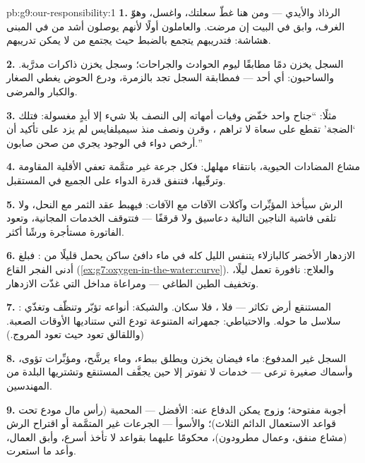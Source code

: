 \begin{solution}{pb:g9:our-responsibility:1}
\textbf{1.} الرذاذ والأيدي --- ومن هنا غطّ سعلتك، واغسل،
وهوّ الغرف، وابق في البيت إن مرضت. والعاملون أولًا لأنهم
يوصلون أشد من في المبنى هشاشة: فتدريبهم يتجمع بالضبط حيث
يجتمع من لا يمكن تدريبهم.

\textbf{2.} السجل يخزن دمًا مطابقًا ليوم الحوادث
والجراحات؛ وسجل  يخزن ذاكرات مدرَّبة. والساحبون:
أي أحد --- فمطابقة السجل تجد بالزمرة، ودرع الحوض يغطي
الصغار والكبار والمرضى.

\textbf{3.} مثلًا: ``جناح واحد خفّض وفيات أمهاته إلى
النصف بلا شيء إلا أيدٍ مغسولة: فتلك `الضجة' تقطع على
سعاة لا تراهم ، وقرن ونصف منذ سيميلفايس لم يزد على
تأكيد أن أرخص دواء في الوجود يجري من صحن صابون.''

\textbf{4.} مشاع المضادات الحيوية، بانتقاء مهلهل: فكل
جرعة غير متمَّمة تعفي الأقلية المقاومة وترقّيها، فتنفق
قدرة الدواء على  الجميع في المستقبل.

\textbf{5.} الرش سيأخذ المؤبِّرات وآكلات الآفات مع
الآفات: فيهبط عقد الثمر مع النحل، ولا تلقى فاشية
الناجين التالية دعاسيق ولا قرقفًا --- فتتوقف الخدمات
المجانية، وتعود الفاتورة  مستأجرة ورشًا أكثر.

\textbf{6.} الازدهار الأخضر كالبازلاء يتنفس الليل كله في
ماء دافئ ساكن يحمل قليلًا من : فبلغ أدنى الفجر
القاع (\cref{ex:g7:oxygen-in-the-water:curve}).
والعلاج: نافورة تعمل ليلًا، وتخفيف الطين  الطاغي
--- ومراعاة مداخل  التي غذّت الازدهار.

\textbf{7.} : المستنقع أرض تكاثر --- فلا ، فلا
سكان. والشبكة: أنواعه تؤبّر وتنظّف وتغذّي سلاسل ما حوله.
والاحتياطي: جمهراته المتنوعة تودع  التي ستناديها
الأوقات الصعبة. (واللقالق تعود حيث تعود المروج.)

\textbf{8.} السجل غير المدفوع: ماء فيضان يخزن ويطلق
ببطء، وماء يرشَّح، ومؤبِّرات تؤوى، وأسماك صغيرة ترعى ---
خدمات لا تفوتر إلا حين يجفَّف المستنقع وتشتريها البلدة
من المهندسين.

\textbf{9.} أجوبة مفتوحة؛ وزوج يمكن الدفاع عنه: الأفضل
--- المحمية (رأس مال مودع تحت قواعد الاستعمال الدائم
الثلاث)؛ والأسوأ --- الجرعات غير المتمَّمة أو اقتراح
الرش (مشاع منفق، وعمال مطرودون)، محكومًا عليهما بقواعد
لا تأخذ أسرع، وأبق العمال، وأعد ما استعرت.


\end{solution}
